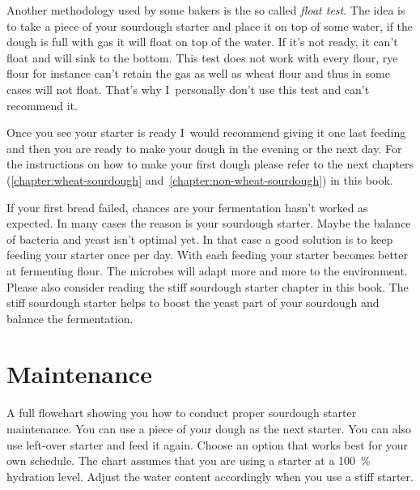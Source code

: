 Another methodology used by some bakers is the so called \emph{float test}.
The idea is to take a piece of your sourdough starter and place it
on top of some water, if the dough is full with gas it will float
on top of the water. If it's not ready, it can't float and will
sink to the bottom. This test does not work with every flour,
rye flour for instance can't retain the gas as well as wheat flour
and thus in some cases will not float. That's why I~personally
don't use this test and can't recommend it.

Once you see your starter is ready I~would recommend giving it
one last feeding and then you are ready to make your dough in the
evening or the next day. For the instructions on how to make your
first dough please refer to the next chapters (\ref{chapter:wheat-sourdough}
and~\ref{chapter:non-wheat-sourdough}) in this book.

If your first bread failed, chances are your fermentation hasn't
worked as expected. In many cases the reason is your sourdough starter. Maybe
the balance of bacteria and yeast isn't optimal yet. In that case a good
solution is to keep feeding your starter once per day. With each feeding your
starter becomes better at fermenting flour. The microbes will adapt more and
more to the environment. Please also consider reading the stiff sourdough starter
chapter in this book. The stiff sourdough starter helps to boost the
yeast part of your sourdough and balance the fermentation.

\section{Maintenance}

\begin{flowchart}[!htb]
\centering
  
  \caption[Sourdough starter maintenance flowchart]{A full flowchart showing
      you how to conduct proper sourdough starter maintenance. You can use a
      piece of your dough as the next starter. You can also use left-over
      starter and feed it again. Choose an option that works best for your own
      schedule. The chart assumes that you are using a starter at a
      \qty{100}{\percent} hydration level. Adjust the water content
      accordingly when you use a stiff starter.}%
  \label{fig:sourdough-maintenance-process}
\end{flowchart}

